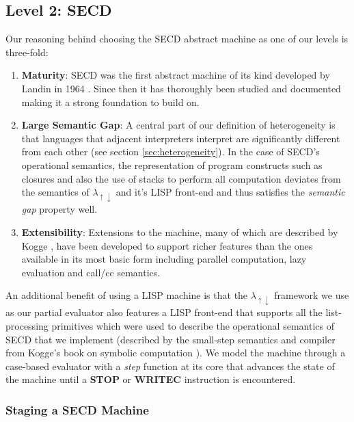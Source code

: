\documentclass[a4paper,12pt,twoside,openright]{report}
\theoremstyle{definition}
\newcommand{\mslang}{$\lambda_{\uparrow\downarrow}$}
\begin{document}

\subsection{Level 2: SECD}\label{sec:secd}
Our reasoning behind choosing the SECD abstract machine as one of our levels is three-fold:
\begin{enumerate}
	\item \textbf{Maturity}: SECD was the first abstract machine of its kind developed by Landin in 1964 \cite{landin1964mechanical}. Since then it has thoroughly been studied and documented \cite{danvy2004rational,ramsdell1999tail,henderson1980functional} making it a strong foundation to build on.
	\item \textbf{Large Semantic Gap}: A central part of our definition of heterogeneity is that languages that adjacent interpreters interpret are significantly different from each other (see section \ref{sec:heterogeneity}). In the case of SECD's operational semantics, the representation of program constructs such as closures and also the use of stacks to perform all computation deviates from the semantics of \mslang{} and it's LISP front-end and thus satisfies the \textit{semantic gap} property well.
	\item \textbf{Extensibility}: Extensions to the machine, many of which are described by Kogge \cite{kogge1990architecture}, have been developed to support richer features than the ones available in its most basic form including parallel computation, lazy evaluation and call/cc semantics.
\end{enumerate}
An additional benefit of using a LISP machine is that the \mslang{} framework we use as our partial evaluator also features a LISP front-end that supports all the list-processing primitives which were used to describe the operational semantics of SECD that we implement (described by the small-step semantics and compiler from Kogge's book on symbolic computation \cite{kogge1990architecture}). We model the machine through a case-based evaluator with a \textit{step} function at its core that advances the state of the machine until a \textbf{STOP} or \textbf{WRITEC} instruction is encountered.

\subsubsection{Staging a SECD Machine}\label{subsec:secd_staged}
\end{document}
